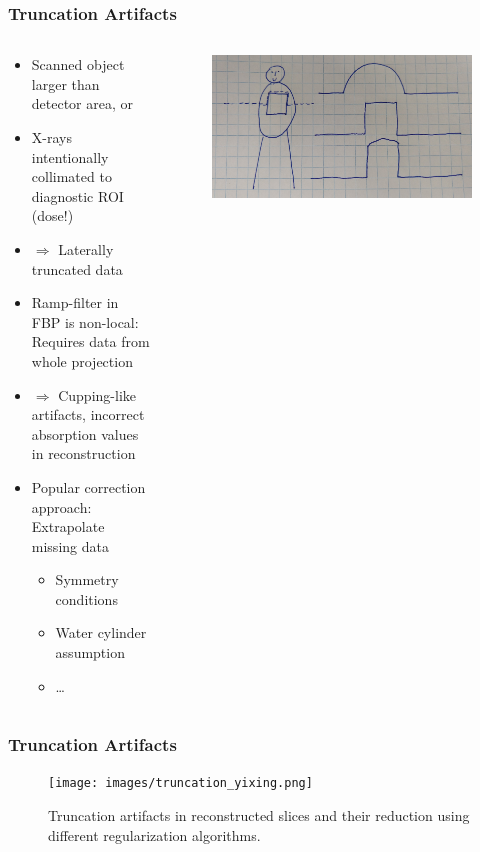 
\begin{frame}
	\frametitle{Truncation Artifacts}
	\begin{columns}[c, onlytextwidth]
		\begin{column}{0.65\textwidth}
		\begin{itemize}
		\setlength\itemsep{0.3cm}
		\item Scanned object larger than detector area, or
		\item X-rays intentionally collimated to diagnostic ROI (dose!)
		\item[ ] $\Rightarrow$ Laterally truncated data
		\item Ramp-filter in FBP is non-local: Requires data from whole projection
		\item[ ] $\Rightarrow$ Cupping-like artifacts, incorrect absorption values in reconstruction
		\item Popular correction approach: Extrapolate missing data
		      \begin{itemize}
			      \item Symmetry conditions
			      \item Water cylinder assumption
			      \item \ldots
		      \end{itemize}
		\end{itemize}
		\end{column}
		\begin{column}{0.35\textwidth}
		 \begin{figure}
			\centering
			\includegraphics[height=0.55\textwidth]{images/truncation_sketch}
		 \end{figure}
	\end{column}
	\end{columns}

\end{frame}

\begin{frame}
	\frametitle{Truncation Artifacts}

	\begin{figure}[tbp]
		\centering
		\texttt{[image: images/truncation\_yixing.png]}
		\caption{Truncation artifacts in reconstructed slices and their reduction using different regularization algorithms.}%
		\label{fig:ct_truncation}
	\end{figure}
	\flushright{}
	\tiny


\end{frame}


